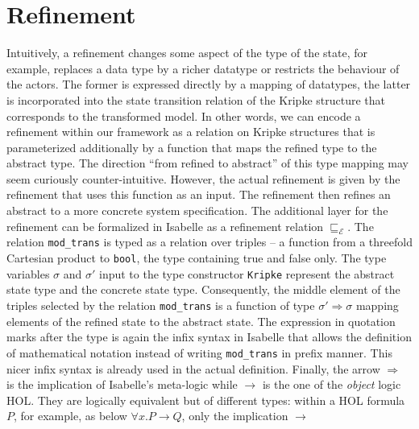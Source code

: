 \documentclass{llncs}
\newcommand{\TODO}[1]{\textcolor{red}{\textbf{[TODO:#1]}}}
\newcommand\ttimp{\mbox{{$\longrightarrow$}}}
\newcommand\ttImp{\mbox{{$\Longrightarrow$}}}
\begin{document}
\section{Refinement}
\label{sec:ref}
Intuitively, a refinement changes some aspect of the type of
the state, for example, replaces a data type by a richer datatype or
restricts the behaviour of the actors. The former is expressed directly 
by a mapping of datatypes, the latter is incorporated into the state
transition relation of the Kripke structure that corresponds to the 
transformed model.
In other words, we can encode a refinement within our framework
as a relation on Kripke structures that is parameterized additionally by
a function that maps the refined type to the abstract type.
The direction ``from refined to abstract'' of this type mapping may seem 
curiously counter-intuitive. However, the actual refinement is given by the 
refinement that uses this function as an input. The refinement
then refines an abstract to a more concrete system specification. 
The additional layer for the refinement 
can be formalized in Isabelle as a
refinement relation 
$\sqsubseteq_{\mathcal{E}}$. 
The relation \texttt{mod\_trans} is typed as a relation over triples --
a function from a threefold Cartesian product to \texttt{bool}, the 
type containing true and false only.  
The type variables $\sigma$ and $\sigma'$ input to the type constructor 
\texttt{Kripke} represent the abstract state type and the concrete state type. 
Consequently, the middle element of the triples selected by the relation 
\texttt{mod\_trans} is a function of type $\sigma' \Rightarrow \sigma$ 
mapping elements of the refined state to the abstract state.
The expression in quotation marks after the type is again the
infix syntax in Isabelle that allows the definition of mathematical notation
instead of writing \texttt{mod\_trans} in prefix manner. This nicer infix
syntax is already used in the actual definition.
Finally, the arrow \texttt{\ttImp} is the implication of Isabelle's  meta-logic
while $\ttimp$ is the one of the {\it object} logic HOL. 
They are logically equivalent but of different
types: within a HOL formula $P$, for example, as below $\forall x. P \ttimp Q$, only the implication $\ttimp$
\end{document}
